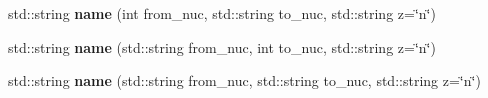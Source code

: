 \begin{Indent}
\begin{DoxyCompactItemize}
\item 
\mbox{\label{namespacepyne_1_1rxname_a462c6500c7bf221f8c897ad2cc5cf45f}} 
std\+::string {\bfseries name} (int from\+\_\+nuc, std\+::string to\+\_\+nuc, std\+::string z=\char`\"{}n\char`\"{})
\item 
\mbox{\label{namespacepyne_1_1rxname_aff733bd008ee84cde43ccfdd5f308472}} 
std\+::string {\bfseries name} (std\+::string from\+\_\+nuc, int to\+\_\+nuc, std\+::string z=\char`\"{}n\char`\"{})
\item 
\mbox{\label{namespacepyne_1_1rxname_ad42b702d8b240b1605616d7c104f0bdc}} 
std\+::string {\bfseries name} (std\+::string from\+\_\+nuc, std\+::string to\+\_\+nuc, std\+::string z=\char`\"{}n\char`\"{})
\end{DoxyCompactItemize}
\end{Indent}
